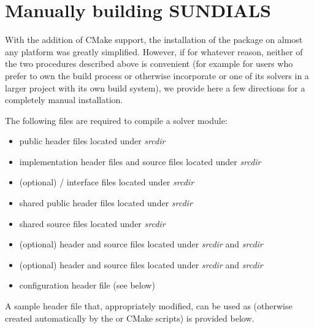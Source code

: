 \section{Manually building SUNDIALS}\label{ss:no_config}

With the addition of CMake support, the installation of the {\sundials} package 
on almost any platform was greatly simplified. However, if for whatever reason,
neither of the two procedures described above is convenient (for example for
users who prefer to own the build process or otherwise incorporate {\sundials}
or one of its solvers in a larger project with its own build system), we
provide here a few directions for a completely manual installation.

The following files are required to compile a {\sundials} solver module:
\begin{itemize}
\item public header files located under 
{\em srcdir}
\item implementation header files and source files located under
{\em srcdir}
\item (optional) {\F}/{\C} interface files located under
{\em srcdir}
\item shared public header files located under
{\em srcdir}
\item shared source files located under
{\em srcdir}
\item (optional) {\nvecs} header and source files located under
{\em srcdir} and {\em srcdir} 
\item (optional) {\nvecp} header and source files located under
{\em srcdir} and {\em srcdir} 
\item configuration header file  (see below)
\end{itemize}
A sample header file that, appropriately modified, can be used as
 (otherwise created automatically by the
 or CMake scripts) is provided below.


